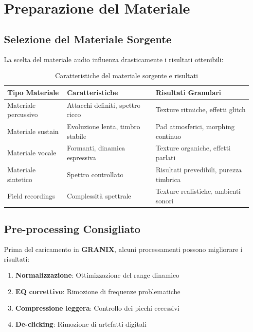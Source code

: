 \documentclass[a4paper,11pt,openany]{book}
\newcommand{\granix}{\textbf{\textcolor{granixblue}{GRANIX}}}
\begin{document}
\section{Preparazione del Materiale}

\subsection{Selezione del Materiale Sorgente}

La scelta del materiale audio influenza drasticamente i risultati ottenibili:

\begin{table}[H]
    \centering
    \caption{Caratteristiche del materiale sorgente e risultati}
    \label{tab:source_material}
    \begin{tabular}{@{}p{3cm}p{4cm}p{6cm}@{}}
        \toprule
        \textbf{Tipo Materiale} & \textbf{Caratteristiche} & \textbf{Risultati Granulari} \\
        \midrule
        Materiale percussivo & Attacchi definiti, spettro ricco & Texture ritmiche, effetti glitch \\
        Materiale sustain & Evoluzione lenta, timbro stabile & Pad atmosferici, morphing continuo \\
        Materiale vocale & Formanti, dinamica espressiva & Texture organiche, effetti parlati \\
        Materiale sintetico & Spettro controllato & Risultati prevedibili, purezza timbrica \\
        Field recordings & Complessità spettrale & Texture realistiche, ambienti sonori \\
        \bottomrule
    \end{tabular}
\end{table}

\subsection{Pre-processing Consigliato}

Prima del caricamento in \granix, alcuni processamenti possono migliorare i risultati:

\begin{enumerate}
    \item \textbf{Normalizzazione}: Ottimizzazione del range dinamico
    \item \textbf{EQ correttivo}: Rimozione di frequenze problematiche
    \item \textbf{Compressione leggera}: Controllo dei picchi eccessivi
    \item \textbf{De-clicking}: Rimozione di artefatti digitali
\end{enumerate}
\end{document}
